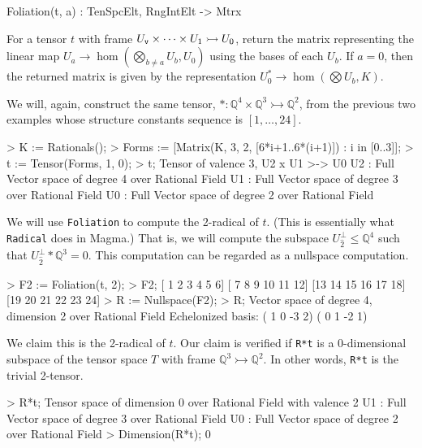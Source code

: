 \begin{intrinsics}
Foliation(t, a) : TenSpcElt, RngIntElt -> Mtrx
\end{intrinsics}

For a tensor $t$ with frame $U_{\operatorname{\mathtt{v}}}\times\cdots\times U_1\rightarrowtail U_0$,
return the matrix representing the linear map 
$U_a\rightarrow \hom(\bigotimes_{b\ne a}U_b,U_0)$ using the bases of each $U_b$.
If $a=0$, then the returned matrix is given by the representation 
$U_0^*\rightarrow \hom(\bigotimes U_b,K)$.

\begin{example}[ExfoliateFoliation]

We will, again, construct the same tensor, 
$*:\mathbb{Q}^4\times\mathbb{Q}^3\rightarrowtail \mathbb{Q}^2$, 
from the previous two examples whose structure constants sequence is $[1,\dots,24]$.
\begin{code}
> K := Rationals();
> Forms := [Matrix(K, 3, 2, [6*i+1..6*(i+1)]) : i in [0..3]];
> t := Tensor(Forms, 1, 0);
> t;
Tensor of valence 3, U2 x U1 >-> U0
U2 : Full Vector space of degree 4 over Rational Field
U1 : Full Vector space of degree 3 over Rational Field
U0 : Full Vector space of degree 2 over Rational Field
\end{code}

We will use \texttt{Foliation} to compute the 2-radical of $t$. 
(This is essentially what \texttt{Radical} does in \textsf{Magma}.)
That is, we will compute the subspace $U_{\hat{2}}^\perp\leq \mathbb{Q}^4$ 
such that $U_{\hat{2}}^\perp*\mathbb{Q}^3=0$. 
This computation can be regarded as a nullspace computation.
\begin{code}
> F2 := Foliation(t, 2);
> F2;
[ 1  2  3  4  5  6]
[ 7  8  9 10 11 12]
[13 14 15 16 17 18]
[19 20 21 22 23 24]
> R := Nullspace(F2);
> R;
Vector space of degree 4, dimension 2 over Rational Field
Echelonized basis:
( 1  0 -3  2)
( 0  1 -2  1)
\end{code}

We claim this is the 2-radical of $t$. Our claim is verified if \texttt{R*t} is
a 0-dimensional subspace of the tensor space $T$ with frame
$\mathbb{Q}^3\rightarrowtail\mathbb{Q}^2$. In other words, \texttt{R*t} is the
trivial 2-tensor.
\begin{code}
> R*t;
Tensor space of dimension 0 over Rational Field with valence 2
U1 : Full Vector space of degree 3 over Rational Field
U0 : Full Vector space of degree 2 over Rational Field
> Dimension(R*t);
0
\end{code}
\end{example}

